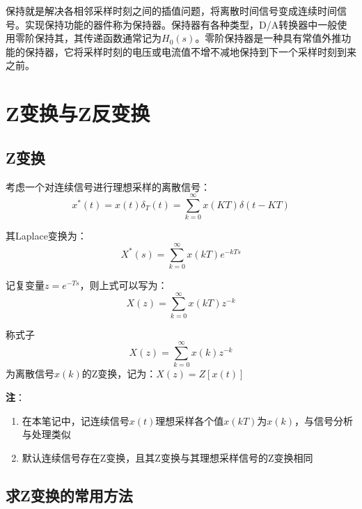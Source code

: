 保持就是解决各相邻采样时刻之间的插值问题，将离散时间信号变成连续时间信号。实现保持功能的器件称为保持器。保持器有各种类型，D/A转换器中一般使用零阶保持其，其传递函数通常记为$H_0(s)$。零阶保持器是一种具有常值外推功能的保持器，它将采样时刻的电压或电流值不增不减地保持到下一个采样时刻到来之前。

\section{Z变换与Z反变换}

\subsection{Z变换}

考虑一个对连续信号进行理想采样的离散信号：
\begin{equation*}
    x^* (t) = x(t) \delta_T(t) = \sum\limits_{k=0}^\infty x(KT) \delta(t-KT)
\end{equation*}

其Laplace变换为：
\begin{equation*}
    X^*(s) = \sum_{k=0}^\infty x(kT)e^{-kTs}
\end{equation*}

记复变量$z = e^{-Ts}$，则上式可以写为：
\begin{equation*}
    X(z) = \sum_{k=0}^\infty x(kT)z^{-k}
\end{equation*}

\begin{definition}
    称式子
    \begin{equation*}
    X(z) = \sum_{k=0}^\infty x(k)z^{-k}
    \end{equation*}
    为离散信号$x(k)$的Z变换，记为：$X(z) = Z[x(t)]$

    \textbf{注}：
    \begin{enumerate}
        \item     在本笔记中，记连续信号$x(t)$理想采样各个值$x(kT)$为$x(k)$，与信号分析与处理类似
        \item 默认连续信号存在Z变换，且其Z变换与其理想采样信号的Z变换相同
    \end{enumerate}


    
\end{definition}

\subsection{求Z变换的常用方法}

